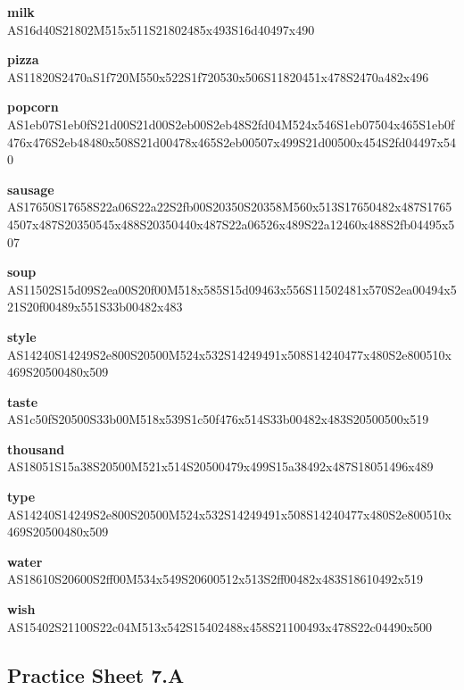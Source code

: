 \documentclass{article}
\begin{document}
\begin{glossary}
\textbf{milk}\\
AS16d40S21802M515x511S21802485x493S16d40497x490

\textbf{pizza}\\
AS11820S2470aS1f720M550x522S1f720530x506S11820451x478S2470a482x496

\textbf{popcorn}\\
AS1eb07S1eb0fS21d00S21d00S2eb00S2eb48S2fd04M524x546S1eb07504x465S1eb0f476x476S2eb48480x508S21d00478x465S2eb00507x499S21d00500x454S2fd04497x540

\textbf{sausage}\\
AS17650S17658S22a06S22a22S2fb00S20350S20358M560x513S17650482x487S17654507x487S20350545x488S20350440x487S22a06526x489S22a12460x488S2fb04495x507

\textbf{soup}\\
AS11502S15d09S2ea00S20f00M518x585S15d09463x556S11502481x570S2ea00494x521S20f00489x551S33b00482x483

\textbf{style}\\
AS14240S14249S2e800S20500M524x532S14249491x508S14240477x480S2e800510x469S20500480x509

\textbf{taste}\\
AS1c50fS20500S33b00M518x539S1c50f476x514S33b00482x483S20500500x519

\textbf{thousand}\\
AS18051S15a38S20500M521x514S20500479x499S15a38492x487S18051496x489

\textbf{type}
AS14240S14249S2e800S20500M524x532S14249491x508S14240477x480S2e800510x469S20500480x509

\textbf{water}\\
AS18610S20600S2ff00M534x549S20600512x513S2ff00482x483S18610492x519

\textbf{wish}\\
AS15402S21100S22c04M513x542S15402488x458S21100493x478S22c04490x500

\end{glossary}

\subsection{Practice Sheet 7.A}
\end{document}
